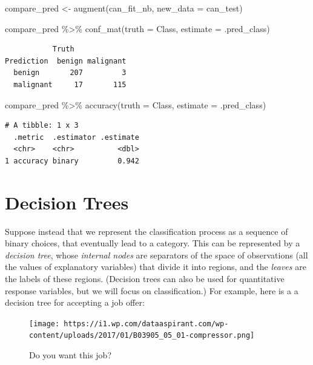 \documentclass[
  letterpaper,
  DIV=11,
  numbers=noendperiod]{scrreprt}
\newenvironment{Shaded}{\begin{snugshade}}{\end{snugshade}}
\newcommand{\AttributeTok}[1]{\textcolor[rgb]{0.40,0.45,0.13}{#1}}
\newcommand{\FunctionTok}[1]{\textcolor[rgb]{0.28,0.35,0.67}{#1}}
\newcommand{\NormalTok}[1]{\textcolor[rgb]{0.00,0.23,0.31}{#1}}
\newcommand{\OtherTok}[1]{\textcolor[rgb]{0.00,0.23,0.31}{#1}}
\newcommand{\SpecialCharTok}[1]{\textcolor[rgb]{0.37,0.37,0.37}{#1}}
\begin{document}
\begin{Shaded}
\begin{Highlighting}[]
\NormalTok{compare\_pred }\OtherTok{\textless{}{-}} \FunctionTok{augment}\NormalTok{(can\_fit\_nb, }\AttributeTok{new\_data =}\NormalTok{ can\_test) }

\NormalTok{compare\_pred }\SpecialCharTok{\%\textgreater{}\%} \FunctionTok{conf\_mat}\NormalTok{(}\AttributeTok{truth =}\NormalTok{ Class, }\AttributeTok{estimate =}\NormalTok{ .pred\_class)}
\end{Highlighting}
\end{Shaded}

\begin{verbatim}
           Truth
Prediction  benign malignant
  benign       207         3
  malignant     17       115
\end{verbatim}

\begin{Shaded}
\begin{Highlighting}[]
\NormalTok{compare\_pred }\SpecialCharTok{\%\textgreater{}\%}  \FunctionTok{accuracy}\NormalTok{(}\AttributeTok{truth =}\NormalTok{ Class, }\AttributeTok{estimate =}\NormalTok{ .pred\_class)}
\end{Highlighting}
\end{Shaded}

\begin{verbatim}
# A tibble: 1 x 3
  .metric  .estimator .estimate
  <chr>    <chr>          <dbl>
1 accuracy binary         0.942
\end{verbatim}

\hypertarget{decision-trees}{%
\section{Decision Trees}\label{decision-trees}}

Suppose instead that we represent the classification process as a
sequence of binary choices, that eventually lead to a category. This can
be represented by a \emph{decision tree}, whose \emph{internal nodes}
are separators of the space of observations (all the values of
explanatory variables) that divide it into regions, and the
\emph{leaves} are the labels of these regions. (Decision trees can also
be used for quantitative response variables, but we will focus on
classification.) For example, here is a a decision tree for accepting a
job offer:

\begin{figure}

{\centering \texttt{[image: https://i1.wp.com/dataaspirant.com/wp-content/uploads/2017/01/B03905\_05\_01-compressor.png]}

}

\caption{Do you want this job?}

\end{figure}
\end{document}
